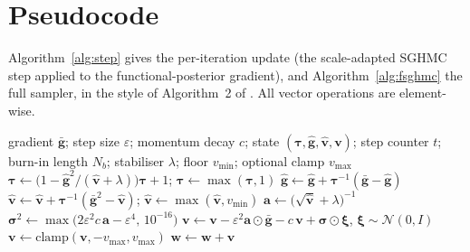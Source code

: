 \documentclass[11pt]{article}
\newcommand{\w}{\mathbf{w}}
\newcommand{\vv}{\mathbf{v}}
\newcommand{\N}{\mathcal{N}}
\newcommand{\gbar}{\bar{\mathbf{g}}}
\newcommand{\vhat}{\hat{\mathbf{v}}}
\newcommand{\ghat}{\hat{\mathbf{g}}}
\newcommand{\btau}{\bm{\tau}}
\begin{document}
\section{Pseudocode}

Algorithm~\ref{alg:step} gives the per-iteration update (the scale-adapted
SGHMC step applied to the functional-posterior gradient), and
Algorithm~\ref{alg:fsghmc} the full sampler, in the style of Algorithm~2 of
\cite{wu2025}.  All vector operations are element-wise.

\begin{algorithm}[t]
\caption{\textsc{AdaptiveStep}: scale-adapted SGHMC update
\cite{springenberg2016}}
\label{alg:step}
\begin{algorithmic}[1]
\Require gradient $\gbar$; step size $\varepsilon$; momentum decay $c$;
  state $(\btau, \ghat, \vhat, \vv)$; step counter $t$; burn-in length $N_b$;
  stabiliser $\lambda$; floor $v_{\min}$; optional clamp $v_{\mathrm{max}}$
  
  \State $\btau \gets \bigl(1 - \ghat^{2}/(\vhat+\lambda)\bigr)\btau + 1$;
    \quad $\btau \gets \max(\btau, 1)$
  \State $\ghat \gets \ghat + \btau^{-1}(\gbar - \ghat)$
  \State $\vhat \gets \vhat + \btau^{-1}(\gbar^{2} - \vhat)$;
    \quad $\vhat \gets \max(\vhat, v_{\min})$
\EndIf
\State $\mathbf{a} \gets \bigl(\sqrt{\vhat} + \lambda\bigr)^{-1}$
\State $\bm{\sigma}^{2} \gets \max\bigl(2\varepsilon^{2} c\,\mathbf{a}
  - \varepsilon^{4},\, 10^{-16}\bigr)$
\State $\vv \gets \vv - \varepsilon^{2}\mathbf{a}\odot\gbar - c\,\vv
  + \bm{\sigma}\odot\bm{\xi}$, \quad $\bm{\xi} \sim \N(0, I)$
  $\vv \gets \mathrm{clamp}(\vv, -v_{\mathrm{max}}, v_{\mathrm{max}})$
\EndIf
\State $\w \gets \w + \vv$
\end{algorithmic}
\end{algorithm}
\end{document}
